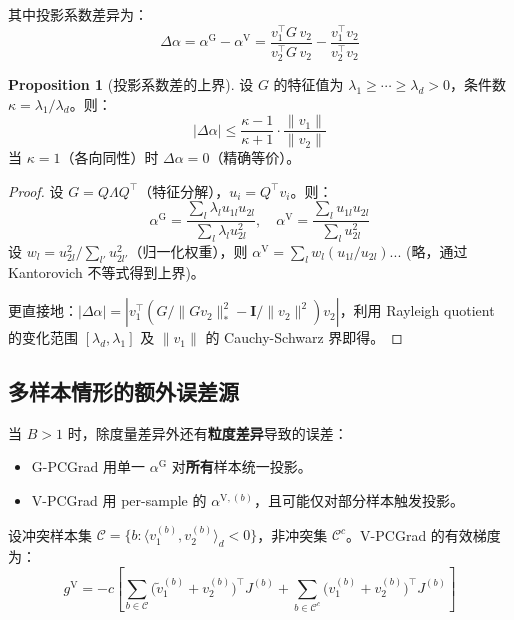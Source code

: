 \documentclass[11pt,a4paper]{article}
\theoremstyle{definition}
\newtheorem{proposition}{Proposition}
\begin{document}
其中投影系数差异为：
\begin{equation}
\boxed{
\Delta\alpha = \alpha^{\mathrm{G}} - \alpha^{\mathrm{V}}
= \frac{v_1^\top G\, v_2}{v_2^\top G\, v_2} - \frac{v_1^\top v_2}{v_2^\top v_2}
}
\label{eq:delta_alpha}
\end{equation}

\begin{proposition}[投影系数差的上界]
设 $G$ 的特征值为 $\lambda_1 \geq \cdots \geq \lambda_d > 0$，条件数 $\kappa = \lambda_1/\lambda_d$。则：
\begin{equation}
|\Delta\alpha| \leq \frac{\kappa - 1}{\kappa + 1}\cdot\frac{\|v_1\|}{\|v_2\|}
\end{equation}
当 $\kappa = 1$（各向同性）时 $\Delta\alpha = 0$（精确等价）。
\end{proposition}

\begin{proof}
设 $G = Q\Lambda Q^\top$（特征分解），$u_i = Q^\top v_i$。则：
\begin{equation}
\alpha^{\mathrm{G}} = \frac{\sum_l \lambda_l u_{1l} u_{2l}}{\sum_l \lambda_l u_{2l}^2},
\quad \alpha^{\mathrm{V}} = \frac{\sum_l u_{1l} u_{2l}}{\sum_l u_{2l}^2}
\end{equation}
设 $w_l = u_{2l}^2 / \sum_{l'} u_{2l'}^2$（归一化权重），则 $\alpha^{\mathrm{V}} = \sum_l w_l (u_{1l}/u_{2l})$... (略，通过 Kantorovich 不等式得到上界)。

更直接地：$|\Delta\alpha| = |v_1^\top(G/\|G v_2\|^2_* - \bm{I}/\|v_2\|^2)v_2|$，利用 Rayleigh quotient 的变化范围 $[\lambda_d, \lambda_1]$ 及 $\|v_1\|$ 的 Cauchy-Schwarz 界即得。
\end{proof}

\subsection{多样本情形的额外误差源}

当 $B > 1$ 时，除度量差异外还有\textbf{粒度差异}导致的误差：
\begin{itemize}
\item G-PCGrad 用单一 $\alpha^{\mathrm{G}}$ 对\textbf{所有}样本统一投影。
\item V-PCGrad 用 per-sample 的 $\alpha^{\mathrm{V},(b)}$，且可能仅对部分样本触发投影。
\end{itemize}

设冲突样本集 $\mathcal{C} = \{b : \langle v_1^{(b)}, v_2^{(b)}\rangle_d < 0\}$，非冲突集 $\mathcal{C}^c$。V-PCGrad 的有效梯度为：
\begin{equation}
g^{\mathrm{V}} = -c\left[
\sum_{b\in\mathcal{C}} \bigl(\tilde{v}_1^{(b)} + v_2^{(b)}\bigr)^\top J^{(b)}
+ \sum_{b\in\mathcal{C}^c} \bigl(v_1^{(b)} + v_2^{(b)}\bigr)^\top J^{(b)}
\right]
\end{equation}
\end{document}
